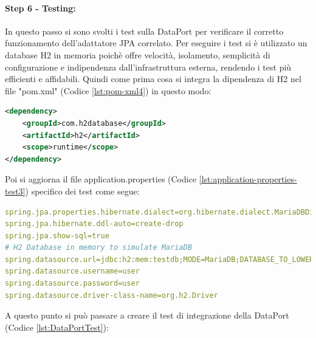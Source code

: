 \paragraph{Step 6 - Testing:}
In questo passo si sono svolti i test sulla DataPort per verificare il corretto funzionamento dell'adattatore JPA correlato. Per eseguire i test si è utilizzato un database H2\cite{H2DB} in memoria poichè offre velocità, isolamento, semplicità di configurazione e indipendenza dall'infrastruttura esterna, rendendo i test più efficienti e affidabili. Quindi come prima cosa si integra la dipendenza di H2 nel file "pom.xml" (Codice \vref{lst:pom-xml4}) in questo modo:
\begin{lstlisting}[language=xml, caption={Aggiornamento del file pom.xml per la dipendenza di H2}, label=lst:pom-xml4]
<dependency>
    <groupId>com.h2database</groupId>
    <artifactId>h2</artifactId>
    <scope>runtime</scope>
</dependency>
\end{lstlisting}
Poi si aggiorna il file application.properties (Codice \vref{lst:application-properties-test3}) specifico dei test come segue:
\begin{lstlisting}[language=yaml, caption={Aggiornamento del file application.properties per i test con H2}, label=lst:application-properties-test3]
spring.jpa.properties.hibernate.dialect=org.hibernate.dialect.MariaDBDialect
spring.jpa.hibernate.ddl-auto=create-drop
spring.jpa.show-sql=true
# H2 Database in memory to simulate MariaDB
spring.datasource.url=jdbc:h2:mem:testdb;MODE=MariaDB;DATABASE_TO_LOWER=TRUE
spring.datasource.username=user
spring.datasource.password=user
spring.datasource.driver-class-name=org.h2.Driver
\end{lstlisting}
A questo punto si può passare a creare il test di integrazione della DataPort (Codice \vref{lst:DataPortTest}):
